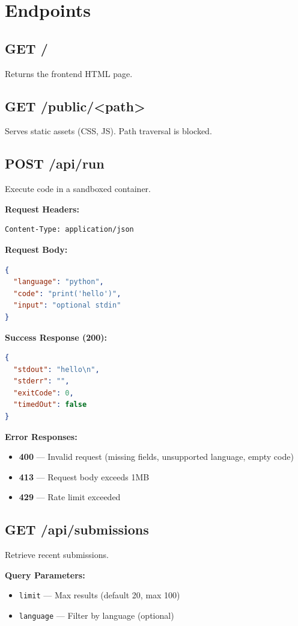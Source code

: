 \documentclass[12pt,a4paper]{report}
\begin{document}
\section{Endpoints}

\subsection{GET /}
Returns the frontend HTML page.

\subsection{GET /public/<path>}
Serves static assets (CSS, JS). Path traversal is blocked.

\subsection{POST /api/run}
Execute code in a sandboxed container.

\textbf{Request Headers:}
\begin{lstlisting}
Content-Type: application/json
\end{lstlisting}

\textbf{Request Body:}
\begin{lstlisting}[language=json]
{
  "language": "python",
  "code": "print('hello')",
  "input": "optional stdin"
}
\end{lstlisting}

\textbf{Success Response (200):}
\begin{lstlisting}[language=json]
{
  "stdout": "hello\n",
  "stderr": "",
  "exitCode": 0,
  "timedOut": false
}
\end{lstlisting}

\textbf{Error Responses:}
\begin{itemize}
    \item \textbf{400} --- Invalid request (missing fields, unsupported language, empty code)
    \item \textbf{413} --- Request body exceeds 1MB
    \item \textbf{429} --- Rate limit exceeded
\end{itemize}

\subsection{GET /api/submissions}
Retrieve recent submissions.

\textbf{Query Parameters:}
\begin{itemize}
    \item \texttt{limit} --- Max results (default 20, max 100)
    \item \texttt{language} --- Filter by language (optional)
\end{itemize}
\end{document}
